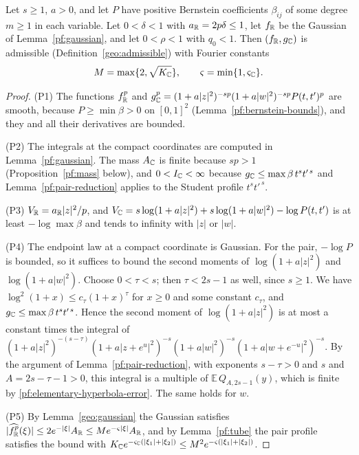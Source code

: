 \begin{proposition}\label{pf:admissible}
Let $s\ge1$, $a>0$, and let $P$ have positive Bernstein coefficients
$\beta_{ij}$ of some degree $m\ge1$ in each variable. Let $0<\delta<1$ with
$a_\mathbb R=2p\delta\le1$, let $f_\mathbb R$ be the Gaussian of
Lemma~\ref{pf:gaussian}, and let $0<\rho<1$ with $q_0<1$. Then
$(f_\mathbb R,g_\mathbb C)$ is admissible (Definition~\ref{geo:admissible}) with Fourier constants
\begin{equation}\label{pf:polynomial-fourier-contract}
 M=\max\{2,\sqrt{K_\mathbb C}\},\qquad \varsigma=\min\{1,\varsigma_\mathbb C\}.
\end{equation}
\end{proposition}

\begin{proof}
(P1) The functions $f_\mathbb R^p$ and
$g_\mathbb C^p=(1+a|z|^2)^{-sp}(1+a|w|^2)^{-sp}P(t,t')^p$ are smooth, because
$P\ge\min\beta>0$ on $[0,1]^2$ (Lemma~\ref{pf:bernstein-bounds}), and they and all their derivatives are
bounded.

(P2) The integrals at the compact coordinates are computed in
Lemma~\ref{pf:gaussian}. The mass $A_\mathbb C$ is finite because $sp>1$
(Proposition~\ref{pf:mass} below), and $0<I_\mathbb C<\infty$ because
$g_\mathbb C\le\max\beta\,t^st'^{\,s}$ and Lemma~\ref{pf:pair-reduction}
applies to the Student profile $t^st'^{\,s}$.

(P3) $V_\mathbb R=a_\mathbb R|z|^2/p$, and
$V_\mathbb C=s\log(1+a|z|^2)+s\log(1+a|w|^2)-\log P(t,t')$ is at least
$-\log\max\beta$ and tends to infinity with $|z|$ or $|w|$.

(P4) The endpoint law at a compact coordinate is Gaussian. For the pair,
$-\log P$ is bounded, so it suffices to bound the second moments of
$\log(1+a|z|^2)$ and $\log(1+a|w|^2)$. Choose $0<\tau<s$; then
$\tau<2s-1$ as well, since $s\ge1$. We have
$\log^2(1+x)\le c_\tau(1+x)^\tau$ for $x\ge0$ and some constant
$c_\tau$, and $g_\mathbb C\le\max\beta\,t^st'^{\,s}$. Hence the second moment
of $\log(1+a|z|^2)$ is at most a constant times the integral of
$(1+a|z|^2)^{-(s-\tau)}(1+a|z+e^u|^2)^{-s}(1+a|w|^2)^{-s}
(1+a|w+e^{-u}|^2)^{-s}$. By the argument of
Lemma~\ref{pf:pair-reduction}, with exponents $s-\tau>0$ and $s$ and
$A=2s-\tau-1>0$, this integral is a multiple of
$\mathbb E\,Q_{A,2s-1}(y)$, which is finite by
\eqref{pf:elementary-hyperbola-error}. The same holds for $w$.

(P5) By Lemma~\ref{geo:gaussian} the Gaussian satisfies
$|\widehat{f_\mathbb R^p}(\xi)|\le2e^{-|\xi|}A_\mathbb R\le Me^{-\varsigma|\xi|}A_\mathbb R$, and by
Lemma~\ref{pf:tube} the pair profile satisfies the bound with
$K_\mathbb C e^{-\varsigma_\mathbb C(|\xi_1|+|\xi_2|)}\le
M^2e^{-\varsigma(|\xi_1|+|\xi_2|)}$.
\end{proof}

